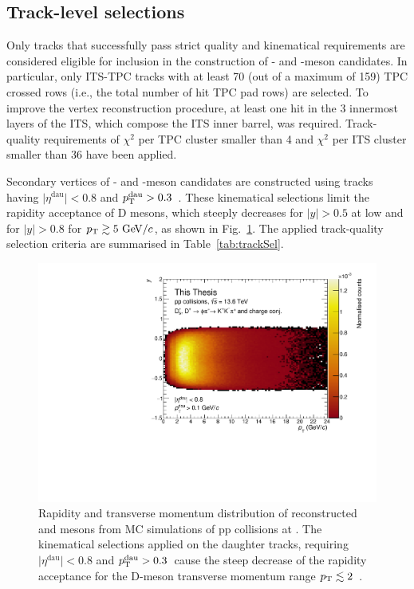 \subsection{Track-level selections}
Only tracks that successfully pass strict quality and kinematical requirements are considered eligible for inclusion in the construction of \ds- and \dpl-meson candidates. In particular, only ITS-TPC tracks with at least 70 (out of a maximum of 159) TPC crossed rows (i.e., the total number of hit TPC pad rows) are selected. To improve the vertex reconstruction procedure, at least one hit in the 3 innermost layers of the ITS, which compose the ITS inner barrel, was required. Track-quality requirements of $\chi^2$ per TPC cluster smaller than 4 and $\chi^2$ per ITS cluster smaller than 36 have been applied.

Secondary vertices of \ds- and \dpl-meson candidates are constructed using tracks having $\lvert\eta^\mathrm{dau}\rvert < 0.8$ and $p_\mathrm{T}^\mathrm{dau} > 0.3$~\gevc. These kinematical selections limit the rapidity acceptance of D mesons, which steeply decreases for $\lvert y\rvert > 0.5$ at low \pt and for $\lvert y\rvert > 0.8$ for $p_\mathrm{T} \gtrsim 5~\mathrm{Ge\kern-.1emV}/c$, as shown in Fig.~\ref{fig:RapidityAcceptance}. The applied track-quality selection criteria are summarised in Table~\ref{tab:trackSel}. 
\begin{figure}[htb]
    \centering
    \includegraphics[width=0.7\linewidth]{Figures/Chapter 4/PtVsY.pdf}
    \caption{Rapidity and transverse momentum distribution of reconstructed \ds and \dpl mesons from MC simulations of pp collisions at \thirteen. The kinematical selections applied on the daughter tracks, requiring $\lvert\eta^\mathrm{dau}\rvert < 0.8$ and $p_\mathrm{T}^\mathrm{dau} > 0.3$~\gevc cause the steep decrease of the rapidity acceptance for the D-meson transverse momentum range $p_\mathrm{T}\lesssim2$~\gev.}
    \label{fig:RapidityAcceptance}
\end{figure}

